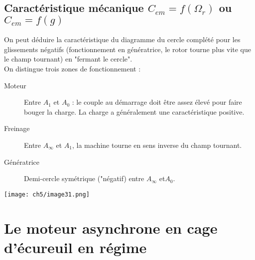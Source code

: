 		
		
	\subsection{Caractéristique mécanique $C_{em} = f(\Omega_r)$ ou $C_{em} = f(g)$}
	On peut déduire la caractéristique du diagramme du cercle complété pour les glissements 
	négatifs (fonctionnement en génératrice, le rotor tourne plus vite que le champ tournant) en 
	"fermant le cercle".\\
	On distingue trois zones de fonctionnement :
	\begin{description}
	\item[Moteur] Entre $A_1$ et $A_0$ : le couple au démarrage doit être assez élevé pour faire 
	bouger la charge. La charge a généralement une caractéristique positive.
	\item[Freinage] Entre $A_\infty$ et $A_1$, la machine tourne en sens inverse du champ tournant.
	\item[Génératrice] Demi-cercle symétrique ("négatif) entre $A_\infty$ et$ A_0$.
	\end{description}
			\begin{center}
		\texttt{[image: ch5/image31.png]}
		\end{center}



\section{Le moteur asynchrone en cage d’écureuil en régime}














	
	
	
	
	
	
	
	
	
	
	